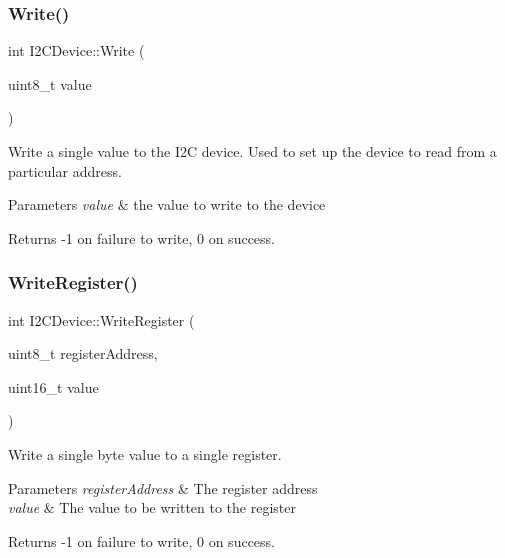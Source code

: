 \subsubsection{\texorpdfstring{Write()}{Write()}}
{\footnotesize\ttfamily int I2\+C\+Device\+::\+Write (\begin{DoxyParamCaption}\item[{uint8\+\_\+t}]{value }\end{DoxyParamCaption})\hspace{0.3cm}{\ttfamily [virtual]}}

Write a single value to the I2C device. Used to set up the device to read from a particular address. 
\begin{DoxyParams}{Parameters}
{\em value} & the value to write to the device \\
\hline
\end{DoxyParams}
\begin{DoxyReturn}{Returns}
-\/1 on failure to write, 0 on success. 
\end{DoxyReturn}
\mbox{\label{classcubesat_1_1I2CDevice_ae80e31206a3b08754ca9649326c7e682}} 
\subsubsection{\texorpdfstring{Write\+Register()}{WriteRegister()}}
{\footnotesize\ttfamily int I2\+C\+Device\+::\+Write\+Register (\begin{DoxyParamCaption}\item[{uint8\+\_\+t}]{register\+Address,  }\item[{uint16\+\_\+t}]{value }\end{DoxyParamCaption})\hspace{0.3cm}{\ttfamily [virtual]}}

Write a single byte value to a single register. 
\begin{DoxyParams}{Parameters}
{\em register\+Address} & The register address \\
\hline
{\em value} & The value to be written to the register \\
\hline
\end{DoxyParams}
\begin{DoxyReturn}{Returns}
-\/1 on failure to write, 0 on success. 
\end{DoxyReturn}


